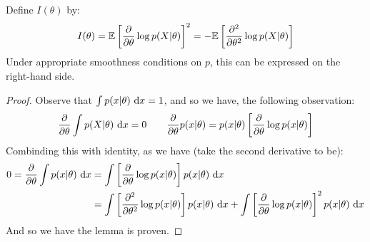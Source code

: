 \begin{lemma}
    Define $I(\theta)$ by:
    \begin{equation*}
        I(\theta) = \mathbb{E}\left[ \frac{\partial}{\partial \theta} \log p(X|\theta) \right]^2 = - \mathbb{E}\left[ \frac{\partial^2}{\partial\theta^2}\log p(X|\theta) \right]
    \end{equation*}
    Under appropriate smoothness conditions on $p$, this can be expressed on the right-hand side.
\end{lemma}
\begin{proof}
    Observe that $\int p(x|\theta)\ \mathrm{d} x = 1$, and so we have, the following observation:
    \begin{equation*}
        \frac{\partial}{\partial\theta} \int p(X|\theta)\ \mathrm{d} x = 0
        \qquad \frac{\partial}{\partial\theta}p(x|\theta) = p(x|\theta)\left[ \frac{\partial}{\partial\theta}\log p(x|\theta) \right]
    \end{equation*}
    Combinding this with identity, as we have (take the second derivative to be):
    \begin{equation*}
    \begin{aligned}
        0 = \frac{\partial}{\partial\theta}\int p(x|\theta)\ \mathrm{d} x &= \int \left[ \frac{\partial}{\partial \theta}\log p(x|\theta) \right]p(x|\theta)\ \mathrm{d} x \\
        &= \int \left[ \frac{\partial^2}{\partial\theta^2}\log p(x|\theta) \right]p(x|\theta)\ \mathrm{d} x + \int \left[ \frac{\partial}{\partial \theta}\log p(x|\theta) \right]^2p(x|\theta)\ \mathrm{d} x \\
    \end{aligned}
    \end{equation*}
    And so we have the lemma is proven.
\end{proof}

